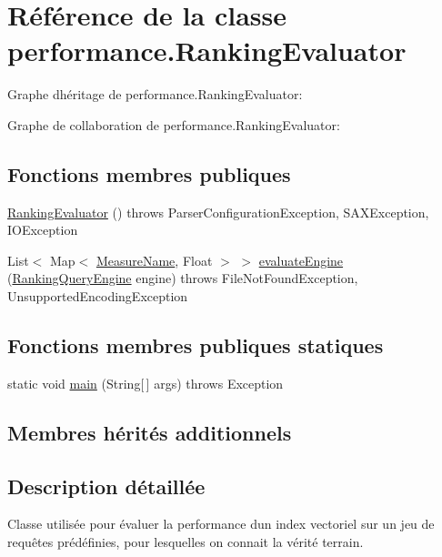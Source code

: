 \hypertarget{classperformance_1_1RankingEvaluator}{}\section{Référence de la classe performance.\+Ranking\+Evaluator}
\label{classperformance_1_1RankingEvaluator}


Graphe d\textquotesingle{}héritage de performance.\+Ranking\+Evaluator\+:


Graphe de collaboration de performance.\+Ranking\+Evaluator\+:
\subsection*{Fonctions membres publiques}
\begin{DoxyCompactItemize}
\item 
\hyperlink{classperformance_1_1RankingEvaluator_a2846c356fd89389971de6071fe9af1ff}{Ranking\+Evaluator} ()  throws Parser\+Configuration\+Exception, S\+A\+X\+Exception, I\+O\+Exception 	
\item 
List$<$ Map$<$ \hyperlink{enumperformance_1_1AbstractEvaluator_1_1MeasureName}{Measure\+Name}, Float $>$ $>$ \hyperlink{classperformance_1_1RankingEvaluator_a416bd329b92e6372d03d07246095303f}{evaluate\+Engine} (\hyperlink{classquery_1_1RankingQueryEngine}{Ranking\+Query\+Engine} engine)  throws File\+Not\+Found\+Exception, Unsupported\+Encoding\+Exception 	
\end{DoxyCompactItemize}
\subsection*{Fonctions membres publiques statiques}
\begin{DoxyCompactItemize}
\item 
static void \hyperlink{classperformance_1_1RankingEvaluator_a395ea5af4738ea8c7bb8017402e4209d}{main} (String\mbox{[}$\,$\mbox{]} args)  throws Exception  	
\end{DoxyCompactItemize}
\subsection*{Membres hérités additionnels}


\subsection{Description détaillée}
Classe utilisée pour évaluer la performance d\textquotesingle{}un index vectoriel sur un jeu de requêtes prédéfinies, pour lesquelles on connait la vérité terrain. 

